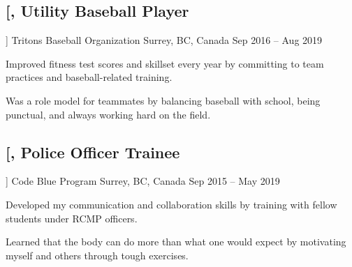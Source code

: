 \documentclass{article}
\newcommand{\datedsubsection}[4][]{
    \subsection*{
        \textbf{\large #2}, #3 \hfill #4
    } %
    \vspace{-4pt} %
    #1 %
}
\begin{document}
{    %
    
    
    \datedsubsection
        [\textit{Utility Baseball Player}]
        {Tritons Baseball Organization}
        {Surrey, BC, Canada}
        {Sep 2016 -- Aug 2019}
    
    \begin{compactitem}
    \item Improved fitness test scores and skillset every year by committing to team practices and baseball-related training.
    \item Was a role model for teammates by balancing baseball with school, being punctual, and always working hard on the field.
    \end{compactitem}
    
    
    
    \datedsubsection
        [\textit{Police Officer Trainee}]
        {Code Blue Program}
        {Surrey, BC, Canada}
        {Sep 2015 -- May 2019}
    
    \begin{compactitem}
    \item Developed my communication and collaboration skills by training with fellow students under RCMP officers.
    \item Learned that the body can do more than what one would expect by motivating myself and others through tough exercises.
    \end{compactitem}
    
    
    
 }
 
\end{document}
